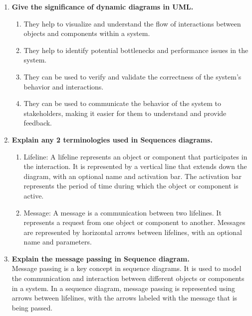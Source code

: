 \documentclass[11pt]{article}
\begin{document}
\begin{enumerate}
	\item \textbf{Give the significance of dynamic diagrams in UML.}\\

	      \begin{enumerate}
		      \item They help to visualize and understand the flow of interactions between objects and components within a system.
		      \item They help to identify potential bottlenecks and performance issues in the system.
		      \item They can be used to verify and validate the correctness of the system's behavior and interactions.
		      \item They can be used to communicate the behavior of the system to stakeholders, making it easier for them to understand and provide feedback.

	      \end{enumerate}
	\item \textbf{Explain any 2 terminologies used in Sequences diagrams.}\\

	      \begin{enumerate}
		      \item Lifeline: A lifeline represents an object or component that participates in the interaction. It is represented by a vertical line that extends down the diagram, with an optional name and activation bar. The activation bar represents the period of time during which the object or component is active.

		      \item Message: A message is a communication between two lifelines. It represents a request from one object or component to another. Messages are represented by horizontal arrows between lifelines, with an optional name and parameters.
	      \end{enumerate}
	\item \textbf{Explain the message passing in Sequence diagram.}\\

	      Message passing is a key concept in sequence diagrams. It is used to model the communication and interaction between different objects or components in a system. In a sequence diagram, message passing is represented using arrows between lifelines, with the arrows labeled with the message that is being passed.\\


\end{enumerate}
\end{document}
